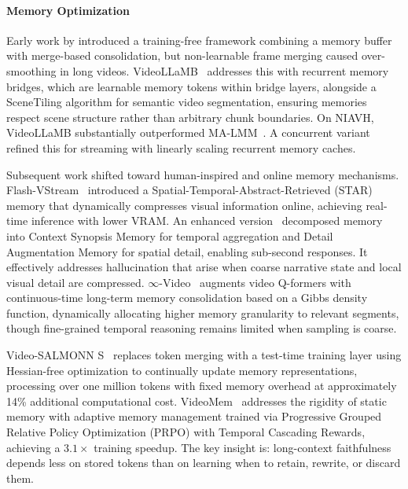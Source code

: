 \documentclass[10pt]{article} %
\begin{document}
\paragraph{Memory Optimization}


Early work by \citet{Song2023MovieChatFD} introduced a training-free framework combining a memory buffer with merge-based consolidation, but non-learnable frame merging caused over-smoothing in long videos. VideoLLaMB~\citep{Wang2024VideoLLaMBLV} addresses this with recurrent memory bridges, which are learnable memory tokens within bridge layers, alongside a SceneTiling algorithm for semantic video segmentation, ensuring memories respect scene structure rather than arbitrary chunk boundaries. On NIAVH, VideoLLaMB substantially outperformed MA-LMM~\citep{He2024MALMMML}. A concurrent variant~\citep{Wang2024VideoLLaMBLS} refined this for streaming with linearly scaling recurrent memory caches.

Subsequent work shifted toward human-inspired and online memory mechanisms. Flash-VStream~\citep{Zhang2024FlashVStreamMR} introduced a Spatial-Temporal-Abstract-Retrieved (STAR) memory that dynamically compresses visual information online, achieving real-time inference with lower VRAM. An enhanced version~\citep{Zhang2025FlashVStreamER} decomposed memory into Context Synopsis Memory for temporal aggregation and Detail Augmentation Memory for spatial detail, enabling sub-second responses. It effectively addresses hallucination that arise when coarse narrative state and local visual detail are compressed. $\infty$-Video~\citep{Santos2025VideoAT} augments video Q-formers with continuous-time long-term memory consolidation based on a Gibbs density function, dynamically allocating higher memory granularity to relevant segments, though fine-grained temporal reasoning remains limited when sampling is coarse.

Video-SALMONN S~\citep{Sun2025videoSALMONNSS} replaces token merging with a test-time training layer using Hessian-free optimization to continually update memory representations, processing over one million tokens with fixed memory overhead at approximately 14\% additional computational cost. VideoMem~\citep{Jin2025VideoMemEU} addresses the rigidity of static memory with adaptive memory management trained via Progressive Grouped Relative Policy Optimization (PRPO) with Temporal Cascading Rewards, achieving a $3.1\times$ training speedup. The key insight is: long-context faithfulness depends less on stored tokens than on learning when to retain, rewrite, or discard them.
\end{document}
